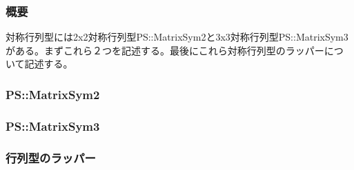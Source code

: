 \subsubsection{概要}

対称行列型には2x2対称行列型PS::MatrixSym2と3x3対称行列型PS::MatrixSym3
がある。まずこれら２つを記述する。最後にこれら対称行列型のラッパーにつ
いて記述する。

\subsubsection{PS::MatrixSym2}



\subsubsection{PS::MatrixSym3}



\subsubsection{行列型のラッパー}



